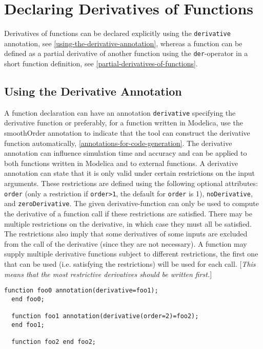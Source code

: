 \section{Declaring Derivatives of Functions}

Derivatives of functions can be declared explicitly using the \lstinline!derivative!
annotation, see \autoref{using-the-derivative-annotation}, whereas a function can be defined as a
partial derivative of another function using the \lstinline!der!-operator in a short
function definition, see \autoref{partial-derivatives-of-functions}.

\subsection{Using the Derivative Annotation}

A function declaration can have an annotation \lstinline!derivative! specifying the
derivative function or preferably, for a function written in Modelica,
use the smoothOrder annotation to indicate that the tool can construct
the derivative function automatically, \autoref{annotations-for-code-generation}. The derivative
annotation can influence simulation time and accuracy and can be applied
to both functions written in Modelica and to external functions. A
derivative annotation can state that it is only valid under certain
restrictions on the input arguments. These restrictions are defined
using the following optional attributes: \lstinline!order! (only a restriction if
\lstinline!order>1!, the default for \lstinline!order! is 1), \lstinline!noDerivative!, and
\lstinline!zeroDerivative!. The given derivative-function can only be used to
compute the derivative of a function call if these restrictions are
satisfied. There may be multiple restrictions on the derivative, in
which case they must all be satisfied. The restrictions also imply that
some derivatives of some inputs are excluded from the call of the
derivative (since they are not necessary). A function may supply
multiple derivative functions subject to different restrictions, the
first one that can be used (i.e. satisfying the restrictions) will be
used for each call. {[}\emph{This means that the most restrictive
derivatives should be written first.}{]}

\begin{example}
\begin{lstlisting}[language=modelica]
  function foo0 annotation(derivative=foo1);
  end foo0;

  function foo1 annotation(derivative(order=2)=foo2);
  end foo1;

  function foo2 end foo2;
\end{lstlisting}
\end{example}

